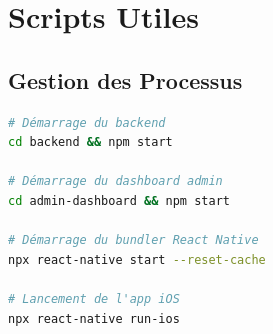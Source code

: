 \section{Scripts Utiles}
\subsection{Gestion des Processus}
\begin{lstlisting}[language=bash]
# Démarrage du backend
cd backend && npm start

# Démarrage du dashboard admin
cd admin-dashboard && npm start

# Démarrage du bundler React Native
npx react-native start --reset-cache

# Lancement de l'app iOS
npx react-native run-ios
\end{lstlisting} 